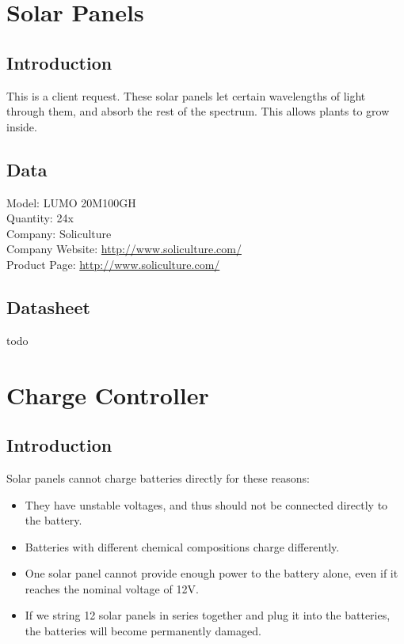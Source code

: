 \section{Solar Panels}
\subsection{Introduction}

This is a client request. These solar panels let certain wavelengths of light through them, and absorb the rest of the spectrum. This allows plants to grow inside.

\subsection{Data}
Model: LUMO 20M100GH \\
Quantity: 24x \\
Company: Soliculture \\
Company Website: \href{http://www.soliculture.com/}{http://www.soliculture.com/} \\
Product Page: \href{http://www.soliculture.com/product/}{http://www.soliculture.com/} \\

\subsection{Datasheet}
todo
 
\section{Charge Controller}
\subsection{Introduction}

Solar panels cannot charge batteries directly for these reasons: 
\begin{itemize}
	\item They have unstable voltages, and thus should not be connected directly to the battery. 
	\item Batteries with different chemical compositions charge differently. 
	\item One solar panel cannot provide enough power to the battery alone, even if it reaches the nominal voltage of 12V. 
	\item If we string 12 solar panels in series together and plug it into the batteries, the batteries will become permanently damaged.
\end{itemize}

